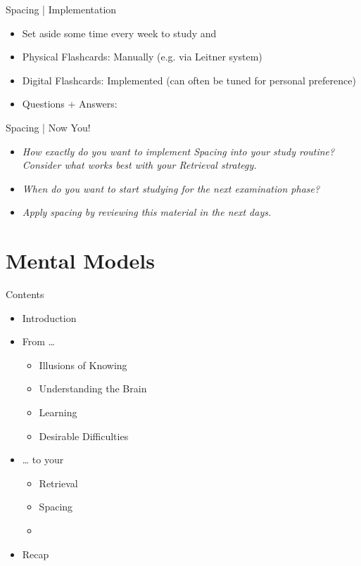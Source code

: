 \documentclass{ercisbeamer}
\begin{document}
\begin{frame}{Spacing | Implementation}
    \begin{itemize}
        \item Set aside some time every week  to study and 
        \item Physical Flashcards: Manually (e.g. via Leitner system)
        \item Digital Flashcards: Implemented  (can often be tuned for personal preference)
        \item Questions + Answers: 
    \end{itemize}
\end{frame}

\begin{frame}{Spacing | Now You!}
    \begin{itemize}
        \item \emph{How exactly do you want to implement Spacing into your study routine? \\ Consider what works best with your Retrieval strategy.}
        \item \emph{When do you want to start studying for the next examination phase?}
        \item \emph{Apply spacing by reviewing this material in the next days.}
    \end{itemize}
\end{frame}

\section{Mental Models}
\begin{frame}{Contents}
    \begin{itemize}
        \item Introduction
        \item From …
        \begin{itemize}
            \item Illusions of Knowing
            \item Understanding the Brain
            \item Learning
            \item Desirable Difficulties
        \end{itemize}
        \item … to your 
        \begin{itemize}
            \item Retrieval
            \item Spacing
            \item {}
        \end{itemize}
        \item Recap
    \end{itemize}
\end{frame}
\end{document}
